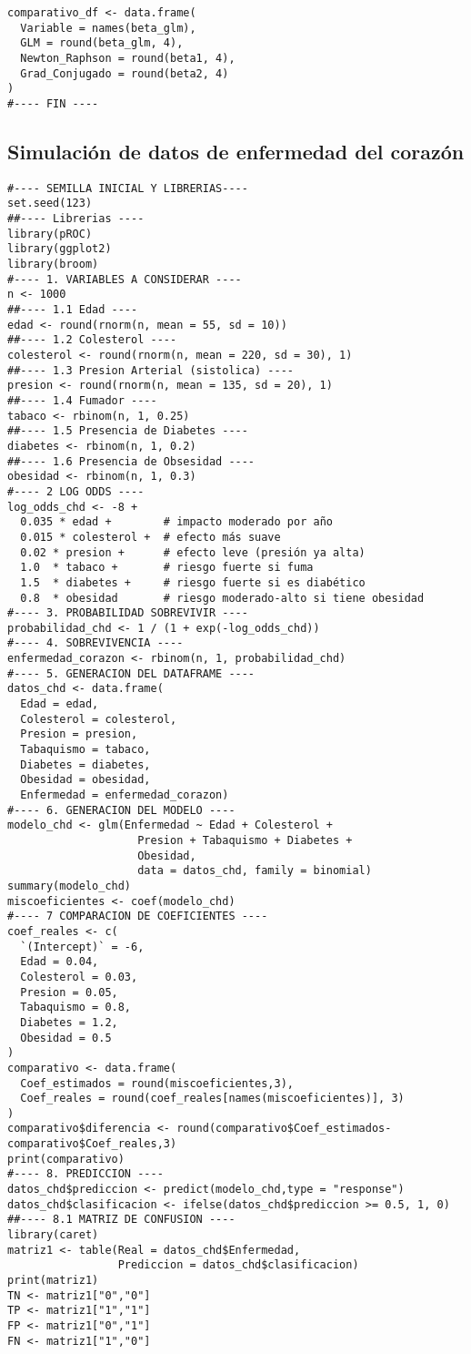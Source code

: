 \documentclass[12pt]{article}
\begin{document}
\begin{verbatim}
comparativo_df <- data.frame(
  Variable = names(beta_glm),
  GLM = round(beta_glm, 4),
  Newton_Raphson = round(beta1, 4),
  Grad_Conjugado = round(beta2, 4)
)
#---- FIN ----
\end{verbatim}

\subsection*{Simulación de datos de enfermedad del corazón}

\begin{verbatim}
#---- SEMILLA INICIAL Y LIBRERIAS---- 
set.seed(123)
##---- Librerias ----
library(pROC)
library(ggplot2)
library(broom)
#---- 1. VARIABLES A CONSIDERAR ----
n <- 1000
##---- 1.1 Edad ----
edad <- round(rnorm(n, mean = 55, sd = 10))
##---- 1.2 Colesterol ----
colesterol <- round(rnorm(n, mean = 220, sd = 30), 1)
##---- 1.3 Presion Arterial (sistolica) ----
presion <- round(rnorm(n, mean = 135, sd = 20), 1)
##---- 1.4 Fumador ----
tabaco <- rbinom(n, 1, 0.25)                        
##---- 1.5 Presencia de Diabetes ----
diabetes <- rbinom(n, 1, 0.2)                     
##---- 1.6 Presencia de Obsesidad ----
obesidad <- rbinom(n, 1, 0.3) 
#---- 2 LOG ODDS ----
log_odds_chd <- -8 +
  0.035 * edad +        # impacto moderado por año
  0.015 * colesterol +  # efecto más suave
  0.02 * presion +      # efecto leve (presión ya alta)
  1.0  * tabaco +       # riesgo fuerte si fuma
  1.5  * diabetes +     # riesgo fuerte si es diabético
  0.8  * obesidad       # riesgo moderado-alto si tiene obesidad
#---- 3. PROBABILIDAD SOBREVIVIR ----
probabilidad_chd <- 1 / (1 + exp(-log_odds_chd))
#---- 4. SOBREVIVENCIA ----
enfermedad_corazon <- rbinom(n, 1, probabilidad_chd)
#---- 5. GENERACION DEL DATAFRAME ----
datos_chd <- data.frame(
  Edad = edad, 
  Colesterol = colesterol, 
  Presion = presion, 
  Tabaquismo = tabaco,
  Diabetes = diabetes,
  Obesidad = obesidad,
  Enfermedad = enfermedad_corazon)
#---- 6. GENERACION DEL MODELO ----
modelo_chd <- glm(Enfermedad ~ Edad + Colesterol + 
                    Presion + Tabaquismo + Diabetes +
                    Obesidad, 
                    data = datos_chd, family = binomial)
summary(modelo_chd)
miscoeficientes <- coef(modelo_chd)
#---- 7 COMPARACION DE COEFICIENTES ----
coef_reales <- c(
  `(Intercept)` = -6,
  Edad = 0.04,
  Colesterol = 0.03,
  Presion = 0.05,
  Tabaquismo = 0.8,
  Diabetes = 1.2,
  Obesidad = 0.5
)
comparativo <- data.frame(
  Coef_estimados = round(miscoeficientes,3),
  Coef_reales = round(coef_reales[names(miscoeficientes)], 3)
)
comparativo$diferencia <- round(comparativo$Coef_estimados-comparativo$Coef_reales,3)
print(comparativo)
#---- 8. PREDICCION ----
datos_chd$prediccion <- predict(modelo_chd,type = "response")
datos_chd$clasificacion <- ifelse(datos_chd$prediccion >= 0.5, 1, 0)
##---- 8.1 MATRIZ DE CONFUSION ---- 
library(caret)
matriz1 <- table(Real = datos_chd$Enfermedad, 
                 Prediccion = datos_chd$clasificacion)
print(matriz1)
TN <- matriz1["0","0"]
TP <- matriz1["1","1"]
FP <- matriz1["0","1"]
FN <- matriz1["1","0"]


\end{verbatim}
\end{document}
